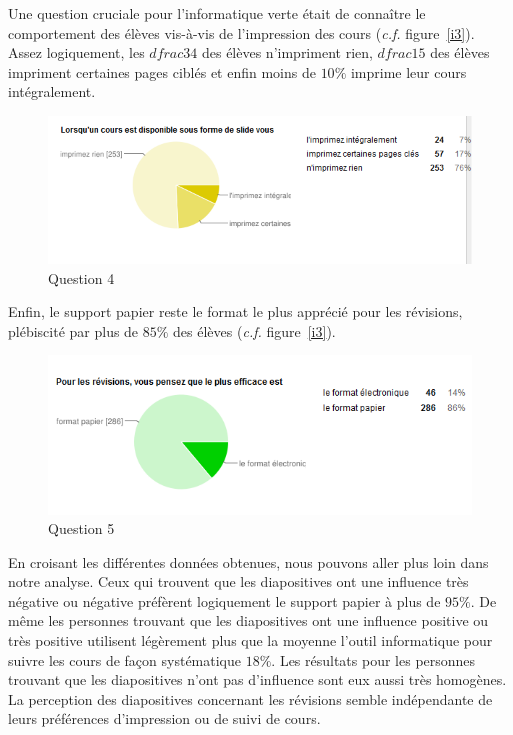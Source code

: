 \documentclass[a4paper,11pt,french]{article}
\begin{document}
Une question cruciale pour l’informatique verte était de connaître le comportement des élèves vis-à-vis de l’impression des cours (\textit{c.f.} figure~\vref{i3}). Assez logiquement, les $dfrac{3}{4}$ des élèves n’impriment rien, $dfrac{1}{5}$ des élèves impriment certaines pages ciblés et enfin moins de $10\%$ imprime leur cours intégralement.

\begin{figure}[h!]
\includegraphics[width=\textwidth]{i4.PNG}
\caption{Question 4}
\label{i4}
\end{figure}


Enfin, le support papier reste le format le plus apprécié pour les révisions, plébiscité par plus de $85\%$ des élèves (\textit{c.f.} figure~\vref{i3}).


\begin{figure}[h!]
\includegraphics[width=\textwidth]{i5.PNG}
\caption{Question 5}
\label{i5}
\end{figure}


En croisant les différentes données obtenues, nous pouvons aller plus loin dans notre analyse. Ceux qui trouvent que les diapositives ont une influence très négative ou négative préfèrent logiquement le support papier à plus de $95\%$. De même les personnes trouvant que les diapositives ont une influence positive ou très positive utilisent légèrement plus que la moyenne l’outil informatique pour suivre les cours de façon systématique $18\%$. Les résultats pour les personnes trouvant que les diapositives n’ont pas d’influence sont eux aussi très homogènes. La perception des diapositives concernant les révisions semble indépendante de leurs préférences d’impression ou de suivi de cours.\\
\end{document}
